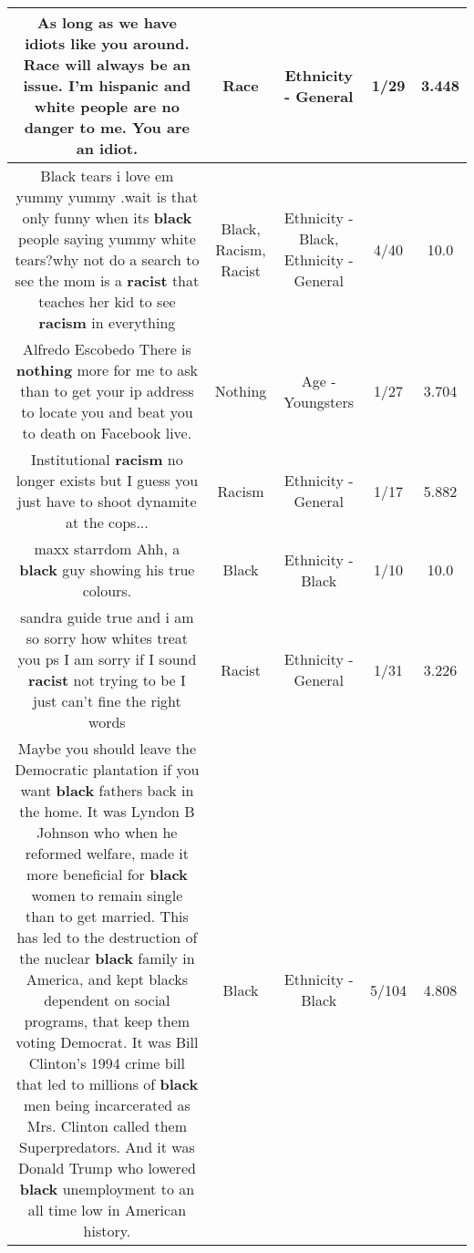 \documentclass[11pt]{article}
\newlength\mylength
\begin{document}
\begin{center}
\begin{longtable}{|C{.65\mylength}|C{.30\mylength}|C{.12\mylength}|C{.12\mylength}|C{.12\mylength}|}
  \small As long as we have idiots like you around. \textbf{Race} will always be an issue. I'm hispanic and white people are no danger to me. You are an idiot.\normalsize   & Race & Ethnicity - General & 1/29 & 3.448 \\  \hline
  \small Black tears i love em yummy yummy .wait is that only funny when its \textbf{black} people saying yummy white tears?why not do a search to see the mom is a \textbf{racist} that teaches her kid to see \textbf{racism} in everything\normalsize   & Black, Racism, Racist & Ethnicity - Black, Ethnicity - General & 4/40 & 10.0 \\  \hline
  \small Alfredo Escobedo There is \textbf{nothing} more for me to ask than to get your ip address to locate you and beat you to death on Facebook live.\normalsize   & Nothing & Age - Youngsters & 1/27 & 3.704 \\  \hline
  \small Institutional \textbf{racism} no longer exists but I guess you just have to shoot dynamite at the cops...\normalsize   & Racism & Ethnicity - General & 1/17 & 5.882 \\  \hline
  \small maxx starrdom Ahh, a \textbf{black} guy showing his true colours.\normalsize   & Black & Ethnicity - Black & 1/10 & 10.0 \\  \hline
  \small sandra guide true and i am so sorry how whites treat you ps I am sorry if I sound \textbf{racist} not trying to be I just can't fine the right words\normalsize   & Racist & Ethnicity - General & 1/31 & 3.226 \\  \hline
  \small Maybe you should leave the Democratic plantation if you want \textbf{black} fathers back in the home. It was Lyndon B Johnson who when he reformed welfare, made it more beneficial for \textbf{black} women to remain single than to get married. This has led to the destruction of the nuclear \textbf{black} family in America, and kept blacks dependent on social programs, that keep them voting Democrat. It was Bill Clinton's 1994 crime bill that led to millions of \textbf{black} men being incarcerated as Mrs. Clinton called them Superpredators. And it was Donald Trump who lowered \textbf{black} unemployment to an all time low in American history.\normalsize   & Black & Ethnicity - Black & 5/104 & 4.808 \\  \hline

\end{longtable}
\end{center}
\end{document}
